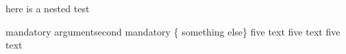 here is a nested test
\begin{five}[optional]{mandatory argument}{second mandatory}
	\{ something else\}
	five text
	five text
	five text
\end{five}
